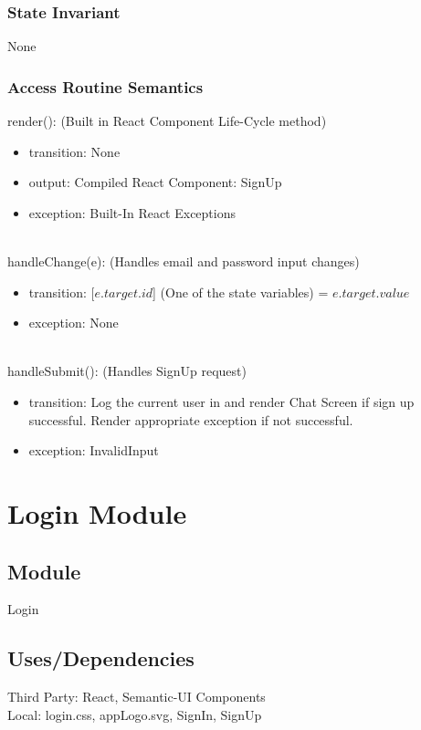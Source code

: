 \documentclass[12pt, titlepage]{article}
\begin{document}
\subsubsection* {State Invariant}
None
\newpage
\subsubsection* {Access Routine Semantics}

render(): (Built in React Component Life-Cycle method)
\begin{itemize}
\item transition: None
\item output: Compiled React Component: SignUp
\item exception: Built-In React Exceptions
\end{itemize}\\
handleChange(e): (Handles email and password input changes)
\begin{itemize}
\item transition: [$e.target.id$] (One of the state variables) = $e.target.value$
\item exception: None
\end{itemize}\\
handleSubmit(): (Handles SignUp request)
\begin{itemize}
\item transition: Log the current user in and render Chat Screen if sign up successful. Render appropriate exception if not successful.
\item exception: InvalidInput 
\end{itemize}

\newpage


\section* {Login Module}

\subsection*{Module}

Login

\subsection* {Uses/Dependencies}
Third Party: React, Semantic-UI Components\\
Local: login.css, appLogo.svg, SignIn, SignUp
\end{document}
